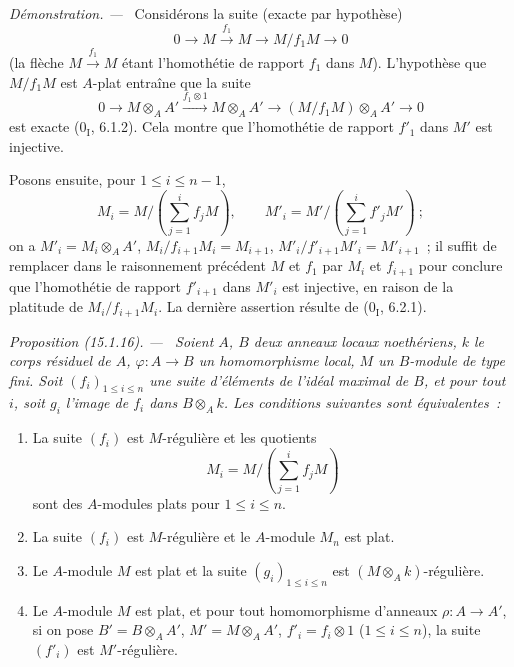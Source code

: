 \documentclass[10pt,oneside]{book}
\makeatletter
\newcommand{\setmanualcurrentlabel}[1]{\def\@currentlabel{#1}}
\newcommand{\oldpage}[2][]{%
  \setcounter{footnote}{0}%
  \marginpar{\scriptsize\textbf{#1}~|~#2}\ignorespaces}
\newenvironment{proposition}[1][]{%
  \setmanualcurrentlabel{#1}\par\medskip\noindent\itshape Proposition (#1). ---\ }{\par}
\newenvironment{proof}{%
  \par\medskip\noindent\textit{Démonstration. ---\ }}{\par}
\makeatother
\begin{document}
\begin{proof}
Considérons la suite (exacte par hypothèse)
\[
  0\longrightarrow M\xrightarrow{f_1}M\longrightarrow M/f_1M
  \longrightarrow0
\]
(la flèche $M\xrightarrow{f_1}M$ étant l'homothétie de rapport $f_1$ dans
$M$). L'hypothèse que $M/f_1M$ est $A$-plat entraîne que la suite
\[
  0\longrightarrow M\otimes_A A'
  \xrightarrow{f_1\otimes1}M\otimes_A A'
  \longrightarrow(M/f_1M)\otimes_A A'\longrightarrow0
\]
\oldpage[0\textsubscript{IV-1}]{18}
est exacte ($0_{\mathrm I}$, 6.1.2). Cela montre que l'homothétie de rapport
$f'_1$ dans $M'$ est injective.

Posons ensuite, pour $1\leq i\leq n-1$,
\[
  M_i=M/\left(\sum_{j=1}^i f_jM\right),\qquad
  M'_i=M'/\left(\sum_{j=1}^i f'_jM'\right)~;
\]
on a $M'_i=M_i\otimes_A A'$, $M_i/f_{i+1}M_i=M_{i+1}$,
$M'_i/f'_{i+1}M'_i=M'_{i+1}$~; il suffit de remplacer dans le raisonnement
précédent $M$ et $f_1$ par $M_i$ et $f_{i+1}$ pour conclure que l'homothétie
de rapport $f'_{i+1}$ dans $M'_i$ est injective, en raison de la platitude de
$M_i/f_{i+1}M_i$. La dernière assertion résulte de ($0_{\mathrm I}$, 6.2.1).
\end{proof}

\begin{proposition}[15.1.16]
\label{0.15.1.16-fr}
Soient $A$, $B$ deux anneaux locaux noethériens, $k$ le corps résiduel de
$A$, $\varphi:A\to B$ un homomorphisme local, $M$ un $B$-module de type fini.
Soit $(f_i)_{1\leq i\leq n}$ une suite d'éléments de l'idéal maximal de $B$,
et pour tout $i$, soit $g_i$ l'image de $f_i$ dans $B\otimes_A k$. Les
conditions suivantes sont équivalentes~:
\begin{enumerate}
  \item[\rm(a)] La suite $(f_i)$ est $M$-régulière et les quotients
  \[
    M_i=M/\left(\sum_{j=1}^i f_jM\right)
  \]
  sont des $A$-modules plats pour $1\leq i\leq n$.
  \item[\rm(b)] La suite $(f_i)$ est $M$-régulière et le $A$-module $M_n$ est
  plat.
  \item[\rm(c)] Le $A$-module $M$ est plat et la suite
  $(g_i)_{1\leq i\leq n}$ est $(M\otimes_A k)$-régulière.
  \item[\rm(d)] Le $A$-module $M$ est plat, et pour tout homomorphisme
  d'anneaux $\rho:A\to A'$, si on pose $B'=B\otimes_A A'$,
  $M'=M\otimes_A A'$, $f'_i=f_i\otimes1$ ($1\leq i\leq n$), la suite
  $(f'_i)$ est $M'$-régulière.
\end{enumerate}
\end{proposition}
\end{document}
